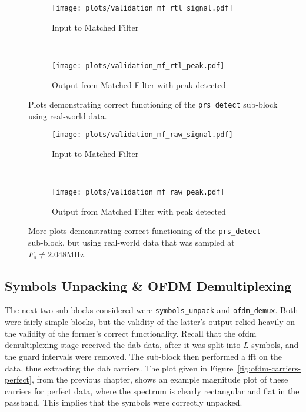 \documentclass[class=report,11pt,crop=false]{standalone}
\begin{document}
\begin{figure}[htbp]
  \centering
  \captionsetup{type=figure}
  \begin{subfigure}[t]{\textwidth}
    \centering
    \captionsetup{type=figure}
    \texttt{[image: plots/validation\_mf\_rtl\_signal.pdf]}
    \caption{Input to Matched Filter}
    \label{fig:validation_mf_rtl_signal}
  \end{subfigure}%
  \\
  \begin{subfigure}[t]{\textwidth}
    \centering
    \captionsetup{type=figure}
    \texttt{[image: plots/validation\_mf\_rtl\_peak.pdf]}
    \caption{Output from Matched Filter with peak detected}
    \label{fig:validation_mf_rtl_peak}
  \end{subfigure}
  \caption{Plots demonstrating correct functioning of the \texttt{prs\_detect} sub-block using real-world data.}
  \label{fig:validation_mf_rtl}
\end{figure}

\begin{figure}[htbp]
  \centering
  \captionsetup{type=figure}
  \begin{subfigure}[t]{\textwidth}
    \centering
    \captionsetup{type=figure}
    \texttt{[image: plots/validation\_mf\_raw\_signal.pdf]}
    \caption{Input to Matched Filter}
    \label{fig:validation_mf_raw_signal}
  \end{subfigure}%
  \\
  \begin{subfigure}[t]{\textwidth}
    \centering
    \captionsetup{type=figure}
    \texttt{[image: plots/validation\_mf\_raw\_peak.pdf]}
    \caption{Output from Matched Filter with peak detected}
    \label{fig:validation_mf_raw_peak}
  \end{subfigure}
  \caption{More plots demonstrating correct functioning of the \texttt{prs\_detect} sub-block, but using real-world data that was sampled at \(F_s \ne 2.048\si{\mega\hertz}\).}
  \label{fig:validation_mf_raw}
\end{figure}

\subsection{Symbols Unpacking \& OFDM Demultiplexing}
The next two sub-blocks considered were \texttt{symbols\_unpack} and \texttt{ofdm\_demux}. Both were fairly simple blocks, but the validity of the latter's output relied heavily on the validity of the former's correct functionality. Recall that the \gls{ofdm} demultiplexing stage received the \gls{dab} data, after it was split into \(L\) symbols, and the guard intervals were removed. The sub-block then performed a \gls{fft} on the data, thus extracting the \gls{dab} carriers. The plot given in Figure~\ref{fig:ofdm-carriers-perfect}, from the previous chapter, shows an example magnitude plot of these carriers for perfect data, where the spectrum is clearly rectangular and flat in the passband. This implies that the symbols were correctly unpacked.
\end{document}
